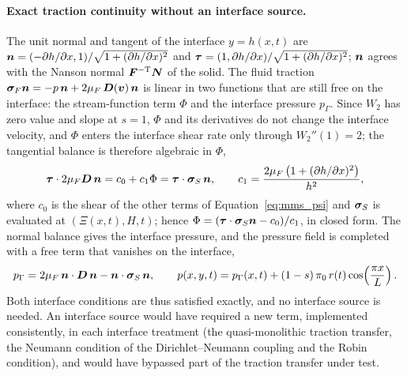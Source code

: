 \paragraph{Exact traction continuity without an interface source.}
The unit normal and tangent of the interface $y = h(x,t)$ are $\boldsymbol{n} = (-\partial h/\partial x, 1)/\sqrt{1+(\partial h/\partial x)^2}$ and $\boldsymbol{\tau} = (1, \partial h/\partial x)/\sqrt{1+(\partial h/\partial x)^2}$; $\boldsymbol{n}$ agrees with the Nanson normal $\boldsymbol{F}^{-\mathrm{T}}\boldsymbol{N}$ of the solid.
The fluid traction $\boldsymbol{\sigma}_F\boldsymbol{n} = -p\,\boldsymbol{n} + 2\mu_F\,\boldsymbol{D}(\boldsymbol{v})\,\boldsymbol{n}$ is linear in two functions that are still free on the interface: the stream-function term $\Phi$ and the interface pressure $p_\Gamma$.
Since $W_2$ has zero value and slope at $s = 1$, $\Phi$ and its derivatives do not change the interface velocity, and $\Phi$ enters the interface shear rate only through $W_2''(1) = 2$; the tangential balance is therefore algebraic in $\Phi$,
\begin{equation}
	\boldsymbol{\tau}\cdot 2\mu_F\boldsymbol{D}\,\boldsymbol{n} = c_0 + c_1\Phi = \boldsymbol{\tau}\cdot\boldsymbol{\sigma}_S\,\boldsymbol{n},
	\qquad
	c_1 = \frac{2\mu_F\left(1 + (\partial h/\partial x)^2\right)}{h^2},
\end{equation}
where $c_0$ is the shear of the other terms of Equation~\eqref{eq:mms_psi} and $\boldsymbol{\sigma}_S$ is evaluated at $(\Xi(x,t), H, t)$; hence $\Phi = (\boldsymbol{\tau}\cdot\boldsymbol{\sigma}_S\boldsymbol{n} - c_0)/c_1$, in closed form.
The normal balance gives the interface pressure, and the pressure field is completed with a free term that vanishes on the interface,
\begin{equation}
	p_\Gamma = 2\mu_F\,\boldsymbol{n}\cdot\boldsymbol{D}\,\boldsymbol{n} - \boldsymbol{n}\cdot\boldsymbol{\sigma}_S\,\boldsymbol{n},
	\qquad
	p(x,y,t) = p_\Gamma(x,t) + (1-s)\,\pi_0\,r(t)\cos\!\left(\frac{\pi x}{L}\right).
\end{equation}
Both interface conditions are thus satisfied exactly, and no interface source is needed.
An interface source would have required a new term, implemented consistently, in each interface treatment (the quasi-monolithic traction transfer, the Neumann condition of the Dirichlet--Neumann coupling and the Robin condition), and would have bypassed part of the traction transfer under test.

